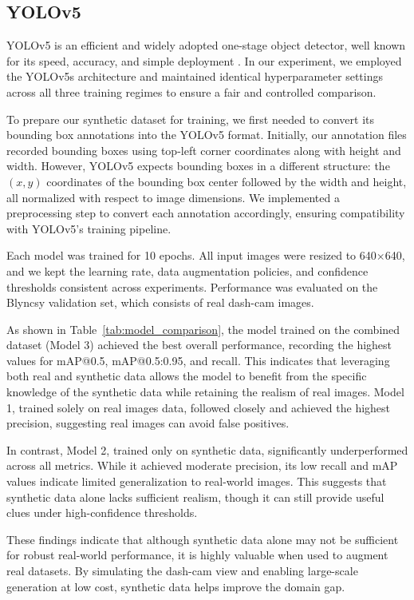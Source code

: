 \documentclass[journal]{IEEEtran}
\begin{document}
\subsection{YOLOv5}
YOLOv5 is an efficient and widely adopted one-stage object detector, well known for its speed, accuracy, and simple deployment \cite{glenn_jocher_2022_7347926}. In our experiment, we employed the YOLOv5s architecture and maintained identical hyperparameter settings across all three training regimes to ensure a fair and controlled comparison.

To prepare our synthetic dataset for training, we first needed to convert its bounding box annotations into the YOLOv5 format. Initially, our annotation files recorded bounding boxes using top-left corner coordinates along with height and width. However, YOLOv5 expects bounding boxes in a different structure: the $(x, y)$ coordinates of the bounding box center followed by the width and height, all normalized with respect to image dimensions. We implemented a preprocessing step to convert each annotation accordingly, ensuring compatibility with YOLOv5’s training pipeline.

Each model was trained for 10 epochs. All input images were resized to 640×640, and we kept the learning rate, data augmentation policies, and confidence thresholds consistent across experiments. Performance was evaluated on the Blyncsy validation set, which consists of real dash-cam images.

As shown in Table~\ref{tab:model_comparison}, the model trained on the combined dataset (Model 3) achieved the best overall performance, recording the highest values for mAP@0.5, mAP@0.5:0.95, and recall. This indicates that leveraging both real and synthetic data allows the model to benefit from the specific knowledge of the synthetic data while retaining the realism of real images. Model 1, trained solely on real images data, followed closely and achieved the highest precision, suggesting real images can avoid false positives.

In contrast, Model 2, trained only on synthetic data, significantly underperformed across all metrics. While it achieved moderate precision, its low recall and mAP values indicate limited generalization to real-world images. This suggests that synthetic data alone lacks sufficient realism, though it can still provide useful clues under high-confidence thresholds.

These findings indicate that although synthetic data alone may not be sufficient for robust real-world performance, it is highly valuable when used to augment real datasets. By simulating the dash-cam view and enabling large-scale generation at low cost, synthetic data helps improve the domain gap.
\end{document}
